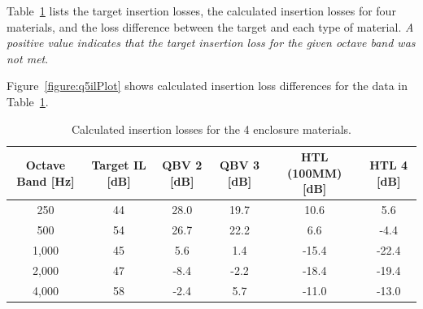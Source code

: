 {\vspace{0.25cm}
Table~\ref{table:targetInsertionLosses} lists the target insertion losses, the calculated insertion losses for four materials, and the loss difference between the target and each type of material.  \textit{A positive value indicates that the target insertion loss for the given octave band was not met}.

\vspace{0.25cm}
Figure~\ref{figure:q5ilPlot} shows calculated insertion loss differences for the data in Table~\ref{table:targetInsertionLosses}.

\vspace{0.25cm}
\setlength{\abovecaptionskip}{0pt}
\vspace{0.1cm}
{\renewcommand{\arraystretch}{1.25}
\begin{table}[h!]
    \begin{center}
        \small
        \begin{tabular}{ | c | c | c | c | c | c |}
            \hline
            \textbf{Octave Band [Hz]}  &  \textbf{Target IL [dB]}  &  \textbf{QBV 2 [dB]}  &  \textbf{QBV 3 [dB]}  &  \textbf{HTL (100MM) [dB]}  &  \textbf{HTL 4 [dB]}  \\
            \hline
            250    &  44  &  28.0  &  19.7  &  10.6   &  5.6  \\
            \rowcolor{Gray}
            500    &  54  &  26.7  &  22.2  &  6.6    &  -4.4  \\
            1,000  &  45  &  5.6   &  1.4   &  -15.4  &  -22.4  \\
            \rowcolor{Gray}            
            2,000  &  47  &  -8.4  &  -2.2  &  -18.4  &  -19.4  \\
            4,000  &  58  &  -2.4  &  5.7   &  -11.0  &  -13.0  \\
            \hline
        \end{tabular}
    \end{center}
    \caption{Calculated insertion losses for the 4 enclosure materials.}
    \label{table:targetInsertionLosses}
\end{table}

}}
